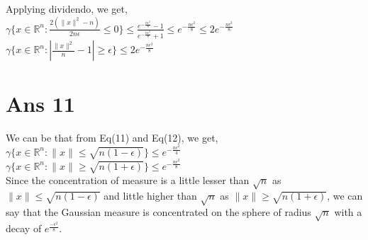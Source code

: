 \documentclass[10pt]{article}
\begin{document}
\begin{flushleft}
\vspace{0.5em}
Applying dividendo, we get,\\
\vspace{0.5em}
$\gamma\{x \in \mathbb{R} ^{n}: \frac{2(\parallel x \parallel ^{2} - n)}{2 n \epsilon} \leq 0\} \leq \frac{e^{-\frac{n \epsilon^{2}}{8}} -1}{e^{-\frac{n \epsilon^{2}}{8}} +1} \leq e^{-\frac{n \epsilon^{2}}{8}} \leq 2 e^{-\frac{n \epsilon^{2}}{8}}$\\
\vspace{0.5em}
$\gamma\{x \in \mathbb{R} ^{n}:  \left|\frac{\parallel x \parallel ^{2}}{n} -1\right| \geq \epsilon \} \leq 2 e^{-\frac{n \epsilon^{2}}{8}}$\\
\end{flushleft}
\section*{Ans 11}
\begin{flushleft}
We can be that from Eq(11) and Eq(12), we get,\\
$\gamma\{x \in \mathbb{R} ^{n}: \parallel x \parallel \leq \sqrt{n(1 - \epsilon)}\} \leq e^{-\frac{n \epsilon^{2}}{4}}$\\
$\gamma\{x \in \mathbb{R} ^{n}: \parallel x \parallel \geq \sqrt{n(1 + \epsilon)}\} \leq e^{-\frac{n \epsilon^{2}}{8}}$\\
Since the concentration of measure is a little lesser than $\sqrt{n}$ as $\parallel x \parallel \leq \sqrt{n(1 - \epsilon)}$ and little higher than $\sqrt{n}$ as $\parallel x \parallel \geq \sqrt{n(1 + \epsilon)}$, we can say that the Gaussian measure is concentrated on the sphere of radius $\sqrt{n}$ with a decay of $e^{\frac{-\epsilon^{2}}{8}}$.
\end{flushleft}
\end{document}
